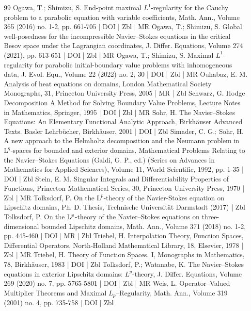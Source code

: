 \documentclass[10pt]{amsart}
\theoremstyle{definition}\newtheorem{defi}[theo]{Definition}\newtheorem{rema}[theo]{Remark}\newtheorem{exam}[theo]{Example}\newtheorem{exem}[theo]{Example}\newtheorem{nota}[theo]{Notation}
\begin{document}
\begin{thebibliography}{99}
 Ogawa, T.; Shimizu, S. End-point maximal ${L}^1$-regularity for the Cauchy problem to a parabolic equation with variable coefficients, Math. Ann., Volume 365 (2016) no. 1-2, pp. 661-705 | DOI | Zbl | MR
 Ogawa, T.; Shimizu, S. Global well-posedness for the incompressible Navier–Stokes equations in the critical Besov space under the Lagrangian coordinates, J. Differ. Equations, Volume 274 (2021), pp. 613-651 | DOI | Zbl | MR
 Ogawa, T.; Shimizu, S. Maximal ${L}^1$-regularity for parabolic initial-boundary value problems with inhomogeneous data, J. Evol. Equ., Volume 22 (2022) no. 2, 30 | DOI | Zbl | MR
 Ouhabaz, E. M. Analysis of heat equations on domains, London Mathematical Society Monographs, 31, Princeton University Press, 2005 | MR | Zbl
 Schwarz, G. Hodge Decomposition A Method for Solving Boundary Value Problems, Lecture Notes in Mathematics, Springer, 1995 | DOI | Zbl | MR
 Sohr, H. The Navier–Stokes Equations: An Elementary Functional Analytic Approach, Birkhäuser Advanced Texts. Basler Lehrbücher, Birkhäuser, 2001 | DOI | Zbl
 Simader, C. G.; Sohr, H. A new approach to the Helmholtz decomposition and the Neumann problem in $\mathrm{L}^q$-spaces for bounded and exterior domains, Mathematical Problems Relating to the Navier–Stokes Equations (Galdi, G. P., ed.) (Series on Advances in Mathematics for Applied Sciences), Volume 11, World Scientific, 1992, pp. 1-35 | DOI | Zbl
 Stein, E. M. Singular Integrals and Differentiability Properties of Functions, Princeton Mathematical Series, 30, Princeton University Press, 1970 | Zbl | MR
 Tolksdorf, P. On the $\mathrm{L}^p$-theory of the Navier-Stokes equation on Lipschitz domains, Ph. D. Thesis, Technische Universität Darmstadt (2017) | Zbl
 Tolksdorf, P. On the ${\rm {L}}^p$-theory of the Navier–Stokes equations on three-dimensional bounded Lipschitz domains, Math. Ann., Volume 371 (2018) no. 1-2, pp. 445-460 | DOI | MR | Zbl
 Triebel, H. Interpolation Theory, Function Spaces, Differential Operators, North-Holland Mathematical Library, 18, Elsevier, 1978 | Zbl | MR
 Triebel, H. Theory of Function Spaces. I, Monographs in Mathematics, 78, Birkhäuser, 1983 | DOI | Zbl
 Tolksdorf, P.; Watanabe, K. The Navier–Stokes equations in exterior Lipschitz domains: ${L}^p$-theory, J. Differ. Equations, Volume 269 (2020) no. 7, pp. 5765-5801 | DOI | Zbl | MR
 Weis, L. Operator–Valued Multiplier Theorems and Maximal ${L}_p$–Regularity, Math. Ann., Volume 319 (2001) no. 4, pp. 735-758 | DOI | Zbl
\end{thebibliography}
\end{document}
